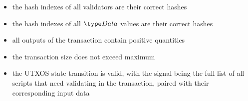 \begin{itemize}
  \item the hash indexes of all validators are their correct hashes

  \item the hash indexes of all $\Data$ values are their correct hashes

  \item all outputs of the transaction contain positive quantities

  \item the transaction size does not exceed maximum

  \item the UTXOS state transition is valid, with the signal being
  the full list of all scripts that need validating in the transaction, paired with
  their corresponding input data
\end{itemize}


